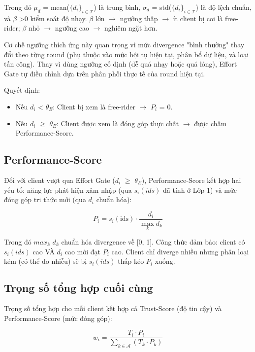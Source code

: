 Trong đó $\mu_{d}$ = mean($\{d_{i}\}_{i\in\mathcal{T}}$) là trung bình, $\sigma_{d}$ = std($\{d_{i}\}_{i\in\mathcal{T}}$) là độ lệch chuẩn, và $\beta$ \textgreater 0 kiểm soát độ nhạy. $\beta$ lớn $\rightarrow$ ngưỡng thấp $\rightarrow$ ít client bị coi là free-rider; $\beta$ nhỏ $\rightarrow$ ngưỡng cao $\rightarrow$ nghiêm ngặt hơn.

Cơ chế ngưỡng thích ứng này quan trọng vì mức divergence "bình thường" thay đổi theo từng round (phụ thuộc vào mức hội tụ hiện tại, phân bổ dữ liệu, và loại tấn công). Thay vì dùng ngưỡng cố định (dễ quá nhạy hoặc quá lỏng), Effort Gate tự điều chỉnh dựa trên phân phối thực tế của round hiện tại.

Quyết định:

\begin{itemize}
\item
  Nếu $d_{i}$ \textless{} $\theta_{E}$: Client bị xem là free-rider $\rightarrow$ $P_{i}$ = 0.
\item
  Nếu $d_{i}$ $\geq$ $\theta_{E}$: Client được xem là đóng góp thực chất $\rightarrow$ được chấm Performance-Score.
\end{itemize}

\subsection{Performance-Score}
Đối với client vượt qua Effort Gate ($d_{i}$ $\geq$ $\theta_{E}$), Performance-Score kết hợp hai yếu tố: năng lực phát hiện xâm nhập (qua $s_{i}(ids)$ đã tính ở Lớp 1) và mức đóng góp tri thức mới (qua $d_{i}$ chuẩn hóa):

\begin{equation}
P_{i} = s_{i}(\text{ids}) \cdot \frac{d_{i}}{\max_{k}d_{k}}
\tag{4.10}
\end{equation}

Trong đó $max_{k}$ $d_{k}$ chuẩn hóa divergence về {[}0, 1{]}. Công thức đảm bảo: client có $s_{i}(ids)$ cao VÀ $d_{i}$ cao mới đạt $P_{i}$ cao. Client chỉ diverge nhiều nhưng phân loại kém (có thể do nhiễu) sẽ bị $s_{i}(ids)$ thấp kéo $P_{i}$ xuống.

\subsection{Trọng số tổng hợp cuối cùng}
Trọng số tổng hợp cho mỗi client kết hợp cả Trust-Score (độ tin cậy) và Performance-Score (mức đóng góp):

\begin{equation}
w_{i} = \frac{T_{i} \cdot P_{i}}{\sum_{k \in \mathcal{A}}^{}(T_{k} \cdot P_{k})}
\tag{4.11}
\end{equation}

